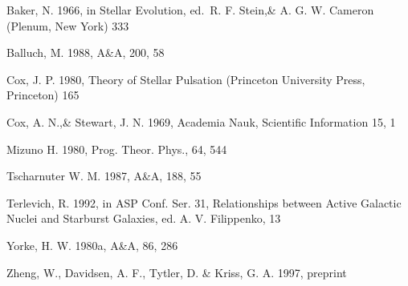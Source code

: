 \documentclass{aa}
\begin{document}
%

\begin{thebibliography}{}

   Baker, N. 1966,
      in Stellar Evolution,
      ed.\ R. F. Stein,\& A. G. W. Cameron
      (Plenum, New York) 333

    Balluch, M. 1988,
      A\&A, 200, 58

    Cox, J. P. 1980,
      Theory of Stellar Pulsation
      (Princeton University Press, Princeton) 165

    Cox, A. N.,\& Stewart, J. N. 1969,
      Academia Nauk, Scientific Information 15, 1

    Mizuno H. 1980,
      Prog. Theor. Phys., 64, 544
   
    Tscharnuter W. M. 1987,
      A\&A, 188, 55
  
    Terlevich, R. 1992, in ASP Conf. Ser. 31,
      Relationships between Active Galactic Nuclei and Starburst Galaxies,
      ed. A. V. Filippenko, 13

    Yorke, H. W. 1980a,
      A\&A, 86, 286

    Zheng, W., Davidsen, A. F., Tytler, D. \& Kriss, G. A.
      1997, preprint
\end{thebibliography}




\end{document}
